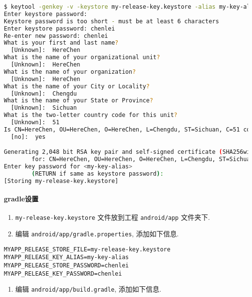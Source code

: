 \begin{lstlisting}[language=bash]
$ keytool -genkey -v -keystore my-release-key.keystore -alias my-key-alias -keyalg RSA -keysize 2048 -validity 10000
Enter keystore password:
Keystore password is too short - must be at least 6 characters
Enter keystore password: chenlei
Re-enter new password: chenlei
What is your first and last name?
  [Unknown]:  HereChen
What is the name of your organizational unit?
  [Unknown]:  HereChen
What is the name of your organization?
  [Unknown]:  HereChen
What is the name of your City or Locality?
  [Unknown]:  Chengdu
What is the name of your State or Province?
  [Unknown]:  Sichuan
What is the two-letter country code for this unit?
  [Unknown]:  51
Is CN=HereChen, OU=HereChen, O=HereChen, L=Chengdu, ST=Sichuan, C=51 correct?
  [no]:  yes

Generating 2,048 bit RSA key pair and self-signed certificate (SHA256withRSA) with a validity of 10,000 days
        for: CN=HereChen, OU=HereChen, O=HereChen, L=Chengdu, ST=Sichuan, C=51
Enter key password for <my-key-alias>
        (RETURN if same as keystore password):
[Storing my-release-key.keystore]
\end{lstlisting}

\paragraph{gradle设置}\label{gradleux8bbeux7f6e}

\begin{enumerate}
\def\labelenumi{\arabic{enumi}.}
\tightlist
\item
  \lstinline!my-release-key.keystore! 文件放到工程
  \lstinline!android/app! 文件夹下.
\item
  编辑 \lstinline!android/app/gradle.properties!, 添加如下信息.
\end{enumerate}

\begin{lstlisting}
MYAPP_RELEASE_STORE_FILE=my-release-key.keystore
MYAPP_RELEASE_KEY_ALIAS=my-key-alias
MYAPP_RELEASE_STORE_PASSWORD=chenlei
MYAPP_RELEASE_KEY_PASSWORD=chenlei
\end{lstlisting}

\begin{enumerate}
\def\labelenumi{\arabic{enumi}.}
\setcounter{enumi}{2}
\tightlist
\item
  编辑 \lstinline!android/app/build.gradle!, 添加如下信息.
\end{enumerate}


